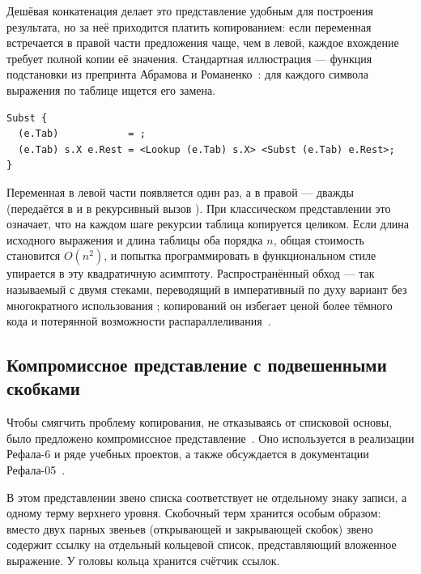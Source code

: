 Дешёвая конкатенация делает это представление удобным для
построения результата, но за неё приходится платить копированием: если переменная
встречается в правой части предложения чаще, чем в левой, каждое  вхождение
требует полной копии её значения. Стандартная иллюстрация --- функция
подстановки из препринта Абрамова и Романенко~\cite{abramov_romanenko_1988}:
для каждого символа выражения по таблице ищется его замена.

\begin{lstlisting}[language=Refal,caption={Подстановка по таблице (пример проблемы копирования)},label={lst:subst-table}]
Subst {
  (e.Tab)            = ;
  (e.Tab) s.X e.Rest = <Lookup (e.Tab) s.X> <Subst (e.Tab) e.Rest>;
}
\end{lstlisting}

Переменная  в левой части появляется один раз, а в правой ---
дважды (передаётся в  и в рекурсивный вызов ).
При классическом представлении это означает, что на каждом шаге рекурсии
таблица копируется целиком. Если длина исходного выражения и длина
таблицы оба порядка \(n\), общая стоимость становится \(O(n^2)\), и
попытка программировать в функциональном стиле упирается в эту
квадратичную асимптоту. Распространённый  обход --- так
называемый  с двумя стеками, переводящий
 в императивный по духу вариант без многократного
использования ; копирований он избегает ценой более тёмного кода и
потерянной возможности распараллеливания~\cite{abramov_romanenko_1988}.

\subsection{Компромиссное представление с подвешенными скобками}
\label{sec:hanging-list}

Чтобы смягчить проблему копирования, не отказываясь от списковой основы,
было предложено компромиссное представление~\cite{skorobogatov_repr}.
Оно используется в реализации Рефала-6 и ряде учебных проектов, а также
обсуждается в документации Рефала-05~\cite{refal05_site}.

В этом представлении звено списка соответствует не отдельному знаку
записи, а одному терму верхнего уровня. Скобочный терм хранится
особым образом: вместо двух парных звеньев (открывающей и закрывающей
скобок) звено содержит ссылку на отдельный кольцевой список, представляющий
вложенное выражение. У головы кольца хранится счётчик ссылок.

